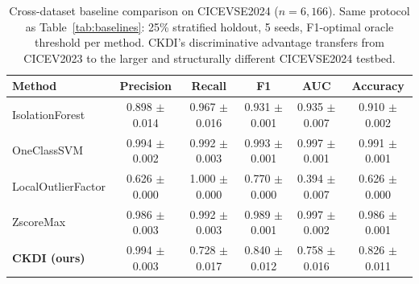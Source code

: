 \begin{table}[t]
\centering
\caption{Cross-dataset baseline comparison on CICEVSE2024 ($n = 6{,}166$). Same protocol as Table~\ref{tab:baselines}: 25\% stratified holdout, 5 seeds, F1-optimal oracle threshold per method. CKDI's discriminative advantage transfers from CICEV2023 to the larger and structurally different CICEVSE2024 testbed.}
\label{tab:crossdataset_baselines}
\begin{tabular}{lccccc}
\toprule
Method & Precision & Recall & F1 & AUC & Accuracy \\
\midrule
IsolationForest & 0.898 $\pm$ 0.014 & 0.967 $\pm$ 0.016 & 0.931 $\pm$ 0.001 & 0.935 $\pm$ 0.007 & 0.910 $\pm$ 0.002 \\
OneClassSVM & 0.994 $\pm$ 0.002 & 0.992 $\pm$ 0.003 & 0.993 $\pm$ 0.001 & 0.997 $\pm$ 0.001 & 0.991 $\pm$ 0.001 \\
LocalOutlierFactor & 0.626 $\pm$ 0.000 & 1.000 $\pm$ 0.000 & 0.770 $\pm$ 0.000 & 0.394 $\pm$ 0.007 & 0.626 $\pm$ 0.000 \\
ZscoreMax & 0.986 $\pm$ 0.003 & 0.992 $\pm$ 0.003 & 0.989 $\pm$ 0.001 & 0.997 $\pm$ 0.002 & 0.986 $\pm$ 0.001 \\
\textbf{CKDI (ours)} & 0.994 $\pm$ 0.003 & 0.728 $\pm$ 0.017 & 0.840 $\pm$ 0.012 & 0.758 $\pm$ 0.016 & 0.826 $\pm$ 0.011 \\
\bottomrule
\end{tabular}
\end{table}

